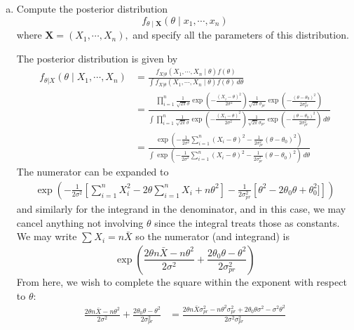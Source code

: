 \documentclass{article}
\begin{document}
\begin{enumerate}
		\begin{enumerate}[(a)]
			\item Compute the posterior distribution \[f_{\theta\mid\bm{X}} (\theta\mid x_1, \cdots, x_n)\] where $\bm{X}=(X_1, \cdots, X_n),$ and specify all the parameters of this distribution.
				\begin{soln}
					The posterior distribution is given by
					\begin{align*}
						f_{\theta|X}(\theta\mid X_1, \cdots, X_n) &= \frac{f_{X|\theta}(X_1, \cdots, X_n\mid \theta)f(\theta)}{\displaystyle\int f_{X|\theta}(X_1, \cdots, X_n\mid \theta)f(\theta)\, d\theta} \\
						&= \frac{\displaystyle\prod_{i=1}^{n} \frac{1}{\sqrt{2\pi}\sigma}\exp\left( -\frac{(X_i-\theta)^2}{2\sigma^2} \right) \frac{1}{\sqrt{2\pi}\sigma_{pr}} \exp\left( -\frac{(\theta-\theta_0)^2}{2\sigma_{pr}^2} \right)}{\displaystyle\int \displaystyle\prod_{i=1}^{n} \frac{1}{\sqrt{2\pi}\sigma}\exp\left( -\frac{(X_i-\theta)^2}{2\sigma^2} \right) \frac{1}{\sqrt{2\pi}\sigma_{pr}} \exp\left( -\frac{(\theta-\theta_0)^2}{2\sigma_{pr}^2} \right)\, d\theta} \\
						&= \frac{\displaystyle\exp\left( -\frac{1}{2\sigma^2}\sum_{i=1}^{n}(X_i-\theta)^2 - \frac{1}{2\sigma_{pr}^2}(\theta-\theta_0)^2 \right)}{\displaystyle\int \exp\left( -\frac{1}{2\sigma^2}\sum_{i=1}^{n}(X_i-\theta)^2 - \frac{1}{2\sigma_{pr}^2}(\theta-\theta_0)^2 \right)\, d\theta}
					\end{align*}
					The numerator can be expanded to
					\begin{align*}
						\exp\left( -\frac{1}{2\sigma^2}\left[ \sum_{i=1}^{n} X_i^2 - 2\theta\sum_{i=1}^{n}X_i + n\theta^2 \right] - \frac{1}{2\sigma_{pr}^2}\left[ \theta^2-2\theta_0\theta+\theta_0^2] \right] \right)
					\end{align*} and similarly for the integrand in the denominator, and in this case, we may cancel anything not involving $\theta$ since the integral treats those as constants. We may write $\sum_{}^{}X_i=n\bar{X}$ so the numerator (and integrand) is 
					\[ \exp\left( \frac{2\theta n\bar{X}-n\theta^2}{2\sigma^2}+\frac{2\theta_0\theta-\theta^2}{2\sigma_{pr}^2} \right)\] 
					From here, we wish to complete the square within the exponent with respect to $\theta:$
					\begin{align*}
						\frac{2\theta n\bar{X}-n\theta^2}{2\sigma^2}+\frac{2\theta_0 \theta-\theta^2}{2\sigma_{pr}^2} &= \frac{2\theta n\bar{X}\sigma_{pr}^2-n\theta^2\sigma_{pr}^2+2\theta_0\theta\sigma^2-\sigma^2\theta^2}{2\sigma^2\sigma_{pr}^2} \\

\end{align*}
\end{soln}
\end{enumerate}
\end{enumerate}
\end{document}
